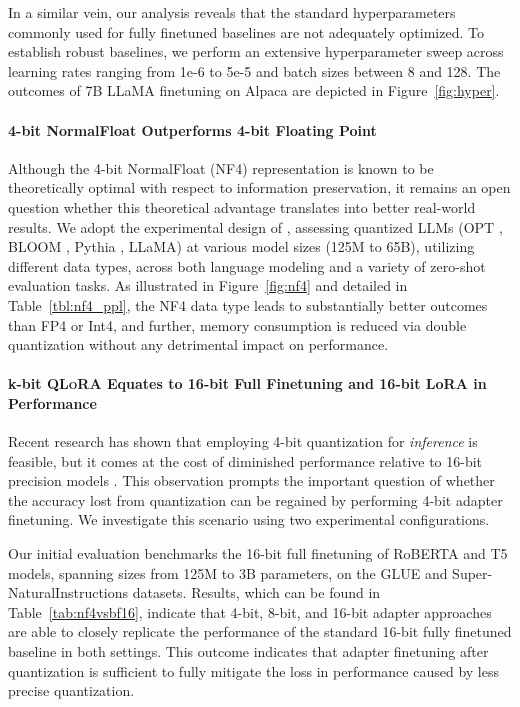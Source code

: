In a similar vein, our analysis reveals that the standard hyperparameters commonly used for fully finetuned baselines are not adequately optimized. To establish robust baselines, we perform an extensive hyperparameter sweep across learning rates ranging from 1e-6 to 5e-5 and batch sizes between 8 and 128. The outcomes of 7B LLaMA finetuning on Alpaca are depicted in Figure~\ref{fig:hyper}.

\paragraph{4-bit NormalFloat Outperforms 4-bit Floating Point}

Although the 4-bit NormalFloat (NF4) representation is known to be theoretically optimal with respect to information preservation, it remains an open question whether this theoretical advantage translates into better real-world results. We adopt the experimental design of \citet{dettmers2022case}, assessing quantized LLMs (OPT \citep{zhang2022opt}, BLOOM \cite{scao2022bloom}, Pythia \cite{biderman2023pythia}, LLaMA) at various model sizes (125M to 65B), utilizing different data types, across both language modeling and a variety of zero-shot evaluation tasks. As illustrated in Figure~\ref{fig:nf4} and detailed in Table~\ref{tbl:nf4_ppl}, the NF4 data type leads to substantially better outcomes than FP4 or Int4, and further, memory consumption is reduced via double quantization without any detrimental impact on performance.

\paragraph{k-bit \textsc{QLoRA} Equates to 16-bit Full Finetuning and 16-bit LoRA in Performance}

Recent research has shown that employing 4-bit quantization for \emph{inference} is feasible, but it comes at the cost of diminished performance relative to 16-bit precision models \citep{dettmers2022case,frantar2022gptq}. This observation prompts the important question of whether the accuracy lost from quantization can be regained by performing 4-bit adapter finetuning. We investigate this scenario using two experimental configurations.

Our initial evaluation benchmarks the 16-bit full finetuning of RoBERTA and T5 models, spanning sizes from 125M to 3B parameters, on the GLUE and Super-NaturalInstructions datasets. Results, which can be found in Table~\ref{tab:nf4vsbf16}, indicate that 4-bit, 8-bit, and 16-bit adapter approaches are able to closely replicate the performance of the standard 16-bit fully finetuned baseline in both settings. This outcome indicates that adapter finetuning after quantization is sufficient to fully mitigate the loss in performance caused by less precise quantization.

